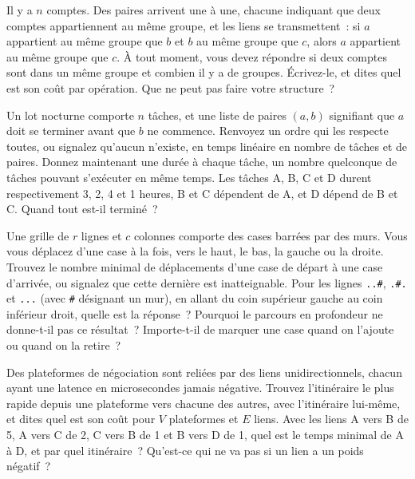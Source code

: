 \begin{question}\label{iq:iv3:algorithms:31}
Il y a $n$ comptes. Des paires arrivent une à une, chacune indiquant que deux comptes appartiennent au même groupe, et les liens se transmettent~: si $a$ appartient au même groupe que $b$ et $b$ au même groupe que $c$, alors $a$ appartient au même groupe que $c$. À tout moment, vous devez répondre si deux comptes sont dans un même groupe et combien il y a de groupes. Écrivez-le, et dites quel est son coût par opération. Que ne peut pas faire votre structure~?
\end{question}

\begin{question}\label{iq:iv3:algorithms:32}
Un lot nocturne comporte $n$ tâches, et une liste de paires $(a, b)$ signifiant que $a$ doit se terminer avant que $b$ ne commence. Renvoyez un ordre qui les respecte toutes, ou signalez qu'aucun n'existe, en temps linéaire en nombre de tâches et de paires. Donnez maintenant une durée à chaque tâche, un nombre quelconque de tâches pouvant s'exécuter en même temps. Les tâches A, B, C et D durent respectivement 3, 2, 4 et 1 heures, B et C dépendent de A, et D dépend de B et C. Quand tout est-il terminé~?
\end{question}

\begin{question}\label{iq:iv3:algorithms:33}
Une grille de $r$ lignes et $c$ colonnes comporte des cases barrées par des murs. Vous vous déplacez d'une case à la fois, vers le haut, le bas, la gauche ou la droite. Trouvez le nombre minimal de déplacements d'une case de départ à une case d'arrivée, ou signalez que cette dernière est inatteignable. Pour les lignes \texttt{.{}.\#}, \texttt{.\#.} et \texttt{.{}.{}.} (avec \texttt{\#} désignant un mur), en allant du coin supérieur gauche au coin inférieur droit, quelle est la réponse~? Pourquoi le parcours en profondeur ne donne-t-il pas ce résultat~? Importe-t-il de marquer une case quand on l'ajoute ou quand on la retire~?
\end{question}

\begin{question}\label{iq:iv3:algorithms:34}
Des plateformes de négociation sont reliées par des liens unidirectionnels, chacun ayant une latence en microsecondes jamais négative. Trouvez l'itinéraire le plus rapide depuis une plateforme vers chacune des autres, avec l'itinéraire lui-même, et dites quel est son coût pour $V$ plateformes et $E$ liens. Avec les liens A vers B de 5, A vers C de 2, C vers B de 1 et B vers D de 1, quel est le temps minimal de A à D, et par quel itinéraire~? Qu'est-ce qui ne va pas si un lien a un poids négatif~?
\end{question}

